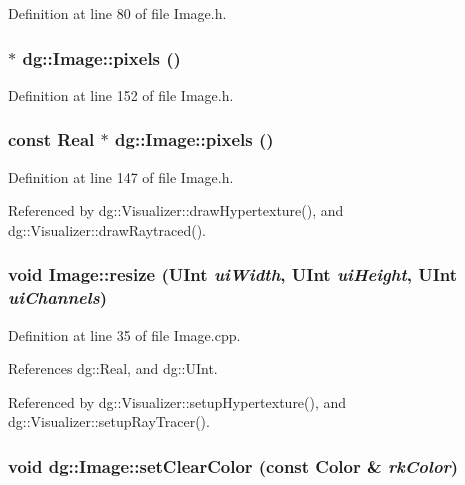Definition at line 80 of file Image.h.
\subsubsection{ $\ast$ dg::Image::pixels ()\hspace{0.3cm}{\tt  [inline]}}\label{classdg_1_1Image_a15}




Definition at line 152 of file Image.h.
\subsubsection{\setlength{\rightskip}{0pt plus 5cm}const {\bf Real} $\ast$ dg::Image::pixels ()\hspace{0.3cm}{\tt  [inline]}}\label{classdg_1_1Image_a14}




Definition at line 147 of file Image.h.

Referenced by dg::Visualizer::draw\-Hypertexture(), and dg::Visualizer::draw\-Raytraced().
\subsubsection{\setlength{\rightskip}{0pt plus 5cm}void Image::resize ({\bf UInt} {\em ui\-Width}, {\bf UInt} {\em ui\-Height}, {\bf UInt} {\em ui\-Channels})}\label{classdg_1_1Image_a22}




Definition at line 35 of file Image.cpp.

References dg::Real, and dg::UInt.

Referenced by dg::Visualizer::setup\-Hypertexture(), and dg::Visualizer::setup\-Ray\-Tracer().
\subsubsection{\setlength{\rightskip}{0pt plus 5cm}void dg::Image::set\-Clear\-Color (const {\bf Color} \& {\em rk\-Color})\hspace{0.3cm}{\tt  [inline]}}\label{classdg_1_1Image_a21}




